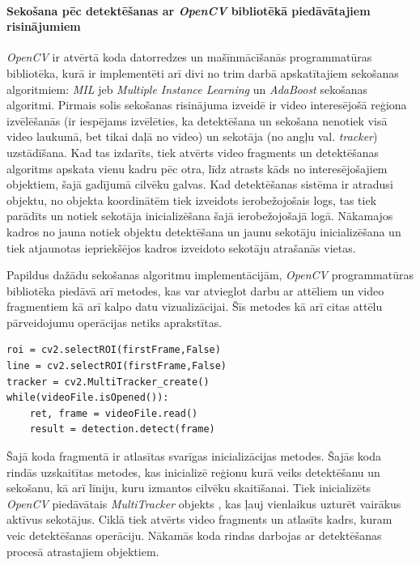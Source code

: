 \paragraph{Sekošana pēc detektēšanas ar \textit{OpenCV} bibliotēkā piedāvātajiem risinājumiem} 
\hfill\par
\textit{OpenCV} ir atvērtā koda datorredzes un mašīnmācīšanās programmatūras bibliotēka, kurā ir implementēti arī divi no trim darbā apskatītajiem sekošanas algoritmiem: \textit{MIL} jeb \textit{Multiple Instance Learning} un \textit{AdaBoost} sekošanas algoritmi. Pirmais solis sekošanas risinājuma izveidē ir video interesējošā reģiona izvēlēšanās (ir iespējams izvēlēties, ka detektēšana un sekošana nenotiek visā video laukumā, bet tikai daļā no video) un sekotāja (no angļu val. \textit{tracker}) uzstādīšana. Kad tas izdarīts, tiek atvērts video fragments un detektēšanas algoritms apskata vienu kadru pēc otra, līdz atrasts kāds no interesējošajiem objektiem, šajā gadījumā cilvēku galvas. Kad detektēšanas sistēma ir atradusi objektu, no objekta koordinātēm tiek izveidots ierobežojošais logs, tas tiek parādīts un notiek sekotāja inicializēšana šajā ierobežojošajā logā. Nākamajos kadros no jauna notiek objektu detektēšana un jaunu sekotāju inicializēšana un tiek atjaunotas iepriekšējos kadros izveidoto sekotāju atrašanās vietas.  

Papildus dažādu sekošanas algoritmu implementācijām, \textit{OpenCV} programmatūras bibliotēka piedāvā arī metodes, kas var atvieglot darbu ar attēliem un video fragmentiem kā arī kalpo datu vizualizācijai. Šīs metodes kā arī citas attēlu pārveidojumu operācijas netiks aprakstītas.

\begin{lstlisting} 
roi = cv2.selectROI(firstFrame,False)
line = cv2.selectROI(firstFrame,False)
tracker = cv2.MultiTracker_create()   
while(videoFile.isOpened()):  
	ret, frame = videoFile.read()     
	result = detection.detect(frame)    
\end{lstlisting}
Šajā koda fragmentā ir atlasītas svarīgas inicializācijas metodes. Šajās koda rindās uzskaitītas metodes, kas inicializē reģionu kurā veiks detektēšanu un sekošanu, kā arī līniju, kuru izmantos cilvēku skaitīšanai. Tiek inicializēts \textit{OpenCV} piedāvātais \textit{MultiTracker} objekts \cite{multitrack}, kas ļauj vienlaikus uzturēt vairākus aktīvus sekotājus. Ciklā tiek atvērts video fragments un atlasīts kadrs, kuram veic detektēšanas operāciju. Nākamās koda rindas darbojas ar detektēšanas procesā atrastajiem objektiem.

